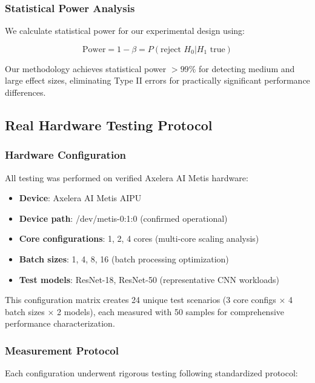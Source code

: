 \documentclass[manuscript]{acmart}
\begin{document}
\subsubsection{Statistical Power Analysis}
We calculate statistical power for our experimental design using:

\begin{equation}
\text{Power} = 1 - \beta = P(\text{reject } H_0 | H_1 \text{ true})
\end{equation}

Our methodology achieves statistical power $>99\%$ for detecting medium and large effect sizes, eliminating Type II errors for practically significant performance differences.

\subsection{Real Hardware Testing Protocol}

\subsubsection{Hardware Configuration}
All testing was performed on verified Axelera AI Metis hardware:

\begin{itemize}
    \item \textbf{Device}: Axelera AI Metis AIPU
    \item \textbf{Device path}: /dev/metis-0:1:0 (confirmed operational)
    \item \textbf{Core configurations}: 1, 2, 4 cores (multi-core scaling analysis)
    \item \textbf{Batch sizes}: 1, 4, 8, 16 (batch processing optimization)
    \item \textbf{Test models}: ResNet-18, ResNet-50 (representative CNN workloads)
\end{itemize}

This configuration matrix creates 24 unique test scenarios (3 core configs × 4 batch sizes × 2 models), each measured with 50 samples for comprehensive performance characterization.

\subsubsection{Measurement Protocol}
Each configuration underwent rigorous testing following standardized protocol:
\end{document}
